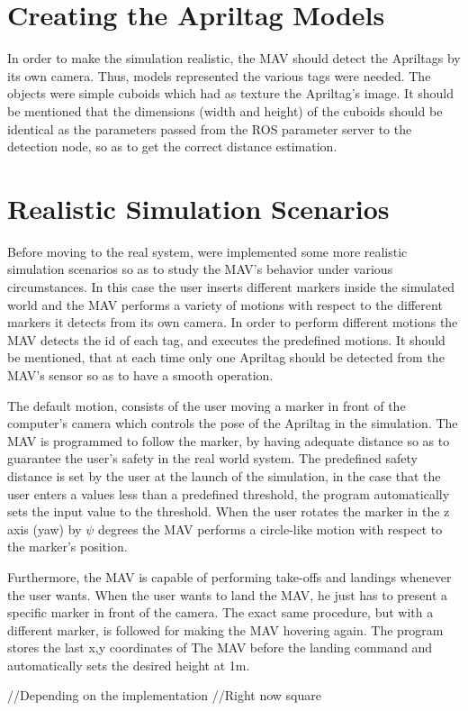 \section{Creating the Apriltag Models}
\label{sec:cubeRobots}

In order to make the simulation realistic, the MAV should detect the Apriltags by its own camera. Thus, models represented the various tags were needed. The objects were simple cuboids which had as texture the Apriltag's image. It should be mentioned that the dimensions (width and height) of the cuboids should be identical as the parameters passed from the ROS parameter server to the detection node, so as to get the correct distance estimation. 

\section{Realistic Simulation Scenarios}
\label{sec: apriltagFireflySimulation}

Before moving to the real system, were implemented some more realistic simulation scenarios so as to study the MAV's behavior under various circumstances. In this case the user inserts different markers inside the simulated world and the MAV performs a variety of motions with respect to the different markers it detects from its own camera. In order to perform different motions the MAV detects the id of each tag, and executes the predefined motions. It should be mentioned, that at each time only one Apriltag should be detected from the MAV's sensor so as to have a smooth operation.

The default motion, consists of the user moving a marker in front of the computer's camera which controls the pose of the Apriltag in the simulation. The MAV is programmed to follow the marker, by having adequate distance so as to guarantee the user's safety in the real world system. The predefined safety distance is set by the user at the launch of the simulation, in the case that the user enters a values less than a predefined threshold, the program automatically sets the input value to the threshold. When the user rotates the marker in the z axis (yaw) by $\psi$ degrees the MAV performs a circle-like motion with respect to the marker's position. 

Furthermore, the MAV is capable of performing take-offs and landings whenever the user wants. When the user wants to land the MAV, he just has to present a specific marker in front of the camera. The exact same procedure, but with a different marker, is followed for making the MAV hovering again. The program stores the last x,y coordinates of The MAV before the landing command and automatically sets the desired height at 1m. 

//Depending on the implementation //Right now square    






















  